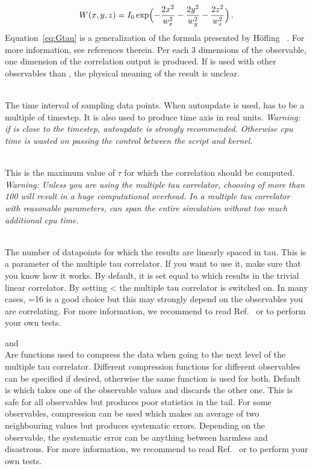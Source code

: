 \begin{arguments}
\begin{itemize}
\begin{equation}
    W(x,y,z) = I_0 \exp \Bigl( - \frac{2x^2}{w_x^2} - \frac{2y^2}{w_y^2} - \frac{2z^2}{w_z^2} \Bigr)\,.
    \end{equation}
    Equation~\ref{eq:Gtau} is a generalization of the formula presented by 
    H\"ofling \etal~\cite{hofling11a}. For more information, see references therein.
    Per each 3 dimensions of the observable, one dimension of the correlation output
    is produced. If  is used with other observables than 
    , the physical meaning of the result is unclear.
  \end{itemize}
\item {} \\
  The time interval of sampling data points. When autoupdate is used,  has
  to be a multiple of timestep. It is also used to produce time axis in real units.
  \textit{Warning: if  is close to the timestep, autoupdate is strongly recommended.
  Otherwise cpu time is wasted on passing the control between the script and kernel.}
\item {} \\
  This is the maximum value of $\tau$ for which the correlation should be computed.
  \textit{Warning: Unless you are using the multiple tau correlator, choosing 
  of more than 100 will result in a huge computational overhead.
  In a multiple tau correlator with reasonable parameters, 
   can span the entire simulation without
  too much additional cpu time.}
\item {} \\
  The number of datapoints for which the results are linearly spaced
  in tau.  This is a parameter of the multiple tau correlator. If you
  want to use it, make sure that you know how it works. By default, it
  is set equal to  which results in the trivial linear
  correlator. By setting  <  the multiple
  tau correlator is switched on. In many cases, =16 is a
  good choice but this may strongly depend on the observables you are
  correlating.  For more information, we recommend to read
  Ref.~\cite{ramirez10a} or to perform your own tests.
\item {} and  \\
  Are functions used to compress the data when going to the next level
  of the multiple tau correlator. Different compression functions for
  different observables can be specified if desired, otherwise the
  same function is used for both.  Default is  which
  takes one of the observable values and discards the other one. This
  is safe for all observables but produces poor statistics in the
  tail. For some observables,  compression can be used
  which makes an average of two neighbouring values but produces
  systematic errors.  Depending on the observable, the systematic
  error can be anything between harmless and disastrous. For more
  information, we recommend to read Ref.~\cite{ramirez10a} or to
  perform your own tests.
\end{arguments}

